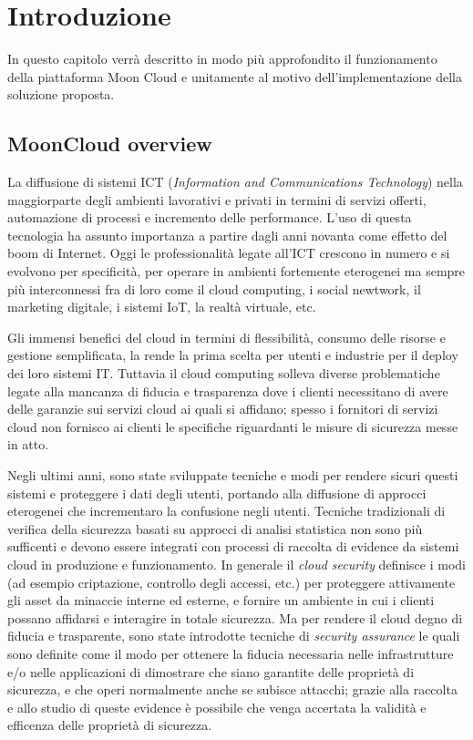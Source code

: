 \chapter{Introduzione}
In questo capitolo verrà descritto in modo più approfondito il funzionamento della piattaforma Moon Cloud e unitamente al 
motivo dell'implementazione della soluzione proposta.

\section{MoonCloud overview}
La diffusione di sistemi ICT (\textit{Information and Communications Technology}) nella maggiorparte degli ambienti lavorativi 
e privati in termini di servizi offerti, automazione di processi e incremento delle performance. L'uso di questa tecnologia 
ha assunto importanza a partire dagli anni novanta come effetto del boom di Internet.
Oggi le professionalità legate all'ICT crescono in numero e si evolvono per specificità, per operare in ambienti fortemente 
eterogenei ma sempre più interconnessi fra di loro come il cloud computing, i social newtwork, il marketing digitale, i sistemi IoT, 
la realtà virtuale, etc.

Gli immensi benefici del cloud in termini di flessibilità, consumo delle risorse e gestione semplificata, la rende la prima 
scelta per utenti e industrie per il deploy dei loro sistemi IT. Tuttavia il cloud computing solleva diverse problematiche
legate alla mancanza di fiducia e trasparenza dove i clienti necessitano di avere delle garanzie sui servizi cloud ai quali 
si affidano; spesso i fornitori di servizi cloud non fornisco ai clienti le specifiche riguardanti le misure di sicurezza 
messe in atto.

Negli ultimi anni, sono state sviluppate tecniche e modi per rendere sicuri questi sistemi e proteggere i dati degli utenti, 
portando alla diffusione di approcci eterogenei che incrementaro la confusione negli utenti.
Tecniche tradizionali di verifica della sicurezza basati su approcci di analisi statistica non sono più sufficenti e
devono essere integrati con processi di raccolta di evidence da sistemi cloud in produzione e funzionamento. 
In generale il \textit{cloud security} definisce i modi (ad esempio criptazione, controllo degli accessi, etc.) per 
proteggere attivamente gli asset da minaccie interne ed esterne, e fornire un ambiente in cui i clienti possano affidarsi 
e interagire in totale sicurezza. 
Ma per rendere il cloud degno di fiducia e trasparente, sono state introdotte tecniche di \textit{security assurance} le 
quali sono definite come il modo per ottenere la fiducia necessaria nelle infrastrutture e/o nelle applicazioni di 
dimostrare che siano garantite delle proprietà di sicurezza, e che operi normalmente anche se subisce attacchi; grazie alla 
raccolta e allo studio di queste evidence è possibile che venga accertata la validità e efficenza delle proprietà di sicurezza.

